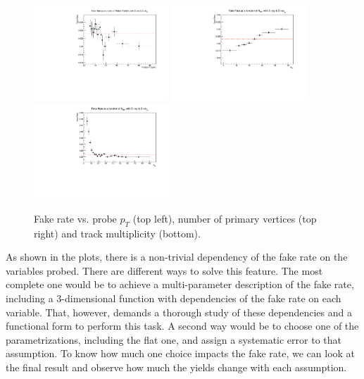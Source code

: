 \begin{figure}[H]
\begin{center}
{\includegraphics[width=0.45\textwidth]{efake_figs/FakeRate_Pt.pdf}}
{\includegraphics[width=0.45\textwidth]{efake_figs/FakeRate_PU.pdf}}
{\includegraphics[width=0.45\textwidth]{efake_figs/FakeRate_Trk.pdf}}
\caption{Fake rate vs. probe $p_T$ (top left), number of primary vertices (top right) and track multiplicity (bottom).}
\label{fig:FR_all}
\end{center}
\end{figure}

As shown in the plots, there is a non-trivial dependency of the fake rate on the variables probed. There are different ways to solve this feature. The most complete one would be to achieve a multi-parameter description of the fake rate, including a 3-dimensional function with dependencies of the fake rate on each variable. That, however, demands a thorough study of these dependencies and a functional form to perform this task. A second way would be to choose one of the parametrizations, including the flat one, and assign a systematic error to that assumption. To know how much one choice impacts the fake rate, we can look at the final result and observe how much the yields change with each assumption.

